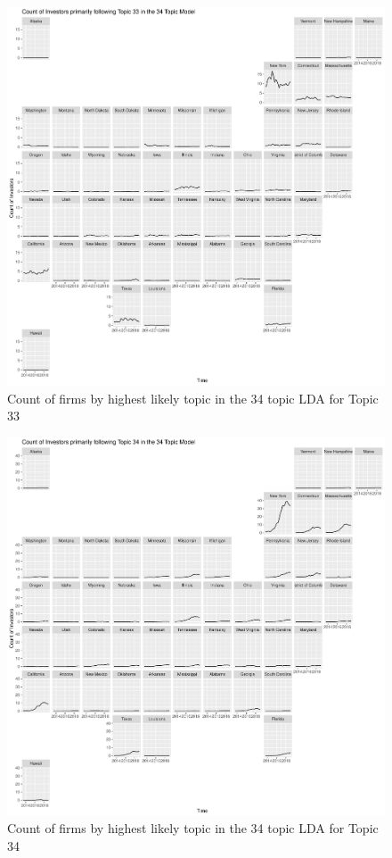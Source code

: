 \begin{figure}
	\centering
	\includegraphics[width=1\linewidth]{Figures/ChapterV/USA_34_Topic33.pdf}
	\caption[Count of Firms for Topic 33 by Quarter]{Count of firms by highest likely topic in the 34 topic LDA for Topic 33}
	\label{fig:StateLDA33}
\end{figure}

\begin{figure}
	\centering
	\includegraphics[width=1\linewidth]{Figures/ChapterV/USA_34_Topic34.pdf}
	\caption[Count of Firms for Topic 34 by Quarter]{Count of firms by highest likely topic in the 34 topic LDA for Topic 34}
	\label{fig:StateLDA34}
\end{figure}

